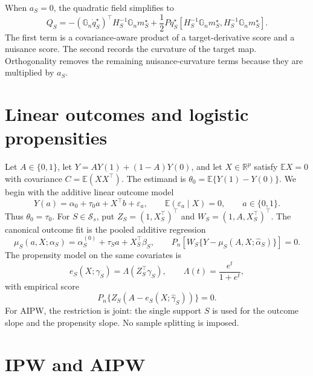 \documentclass[a4paper,10pt,english]{article}
\newcommand{\E}{\mathbb E}
\newcommand{\R}{\mathbb R}
\begin{document}
When $a_S=0$, the quadratic field simplifies to
\begin{equation}\label{eq:orthogonal-quadratic-field}
 Q_S=-(\mathbb G_n\dot q_S^\star)^\top
 H_S^{-1}\mathbb G_nm_S^\star
 +\frac12P\ddot q_S^\star
 \left[H_S^{-1}\mathbb G_nm_S^\star,
       H_S^{-1}\mathbb G_nm_S^\star\right].
\end{equation}
The first term is a covariance-aware product of a target-derivative score
and a nuisance score.  The second records the curvature of the target map.
Orthogonality removes the remaining nuisance-curvature terms because they
are multiplied by $a_S$.

\section{Linear outcomes and logistic propensities}

Let $A\in\{0,1\}$, let $Y=AY(1)+(1-A)Y(0)$, and let $X\in\R^p$ satisfy
$\E X=0$ with covariance $C=\E(XX^\top)$.  The estimand is
$\theta_0=\E\{Y(1)-Y(0)\}$.  We begin with the additive linear outcome
model
\begin{equation}\label{eq:linear-potential-outcomes}
 Y(a)=\alpha_0+\tau_0a+X^\top b+\varepsilon_a,
 \qquad
 \E(\varepsilon_a\mid X)=0,
 \qquad a\in\{0,1\}.
\end{equation}
Thus $\theta_0=\tau_0$.  For $S\in\mathcal S_s$, put
$Z_S=(1,X_S^\top)^\top$ and
$W_S=(1,A,X_S^\top)^\top$.  The canonical outcome fit is the pooled
additive regression
\begin{equation}\label{eq:linear-outcome-models}
 \mu_S(a,X;\alpha_S)=\alpha_S^{(0)}+\tau_Sa+X_S^\top\beta_S,
 \qquad
 P_n[W_S\{Y-\mu_S(A,X;\hat\alpha_S)\}]=0.
\end{equation}
The propensity model on the same covariates is
\begin{equation}\label{eq:logistic-propensity}
 e_S(X;\gamma_S)=\Lambda(Z_S^\top\gamma_S),
 \qquad
 \Lambda(t)=\frac{e^t}{1+e^t},
\end{equation}
with empirical score
\begin{equation}\label{eq:logistic-score}
 P_n\{Z_S(A-e_S(X;\hat\gamma_S))\}=0.
\end{equation}
For AIPW, the restriction is joint: the single support $S$ is used for the
outcome slope and the propensity slope.  No sample splitting is imposed.

\section{IPW and AIPW}
\end{document}
